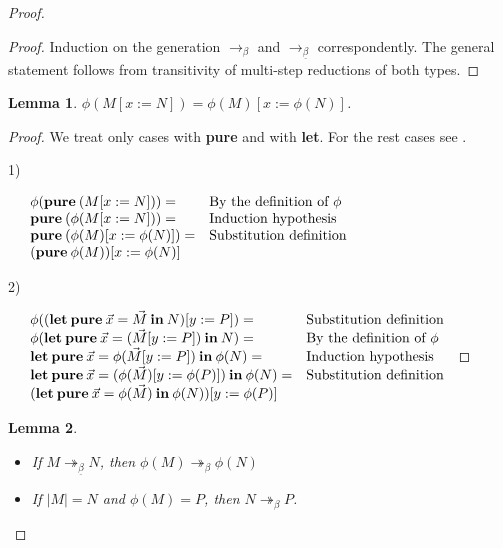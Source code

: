 \documentclass[a4paper]{article}
\newtheorem{lemma}{Lemma}
\begin{document}
\begin{proof}
\begin{proof}

  Induction on the generation $\rightarrow_{\beta}$ and $\rightarrow_{\underline{\beta}}$ correspondently. The general statement follows from transitivity
  of multi-step reductions of both types.
\end{proof}

\begin{lemma}
  $\phi(M [x := N]) = \phi(M) [x := \phi(N)]$.
\end{lemma}

\begin{proof}
  We treat only cases with {\bf pure} and with {\bf let}. For the rest cases see \cite{Baren}.

  1)
  $ $

  $\begin{array}{lll}
  & \phi({\bf pure \:} (M [x := N])) = & \text{By the definition of $\phi$}\\
  & {\bf pure \:} (\phi(M [x := N])) = & \text{Induction hypothesis} \\
  & {\bf pure \:} (\phi(M) [x := \phi(N)]) = & \text{Substitution definition}\\
  & ({\bf pure \:} \phi (M)) [x := \phi(N)]&
  \end{array}$

  2)
  $ $

  $\begin{array}{lll}
  &\phi(({\bf let \: pure \:} \vec{x} = \vec{M} {\: \bf in \:} N) [y := P]) = & \text{Substitution definition}\\
  &\phi({\bf let \: pure \:} \vec{x} = (\vec{M}[y := P]) {\: \bf in \:} N) = & \text{By the definition of $\phi$}\\
  &{\bf let \: pure \:} \vec{x} = \phi(\vec{M}[y := P]) {\: \bf in \:} \phi(N) = & \text{Induction hypothesis} \\
  &{\bf let \: pure \:} \vec{x} = (\phi(\vec{M}) [y := \phi(P)]) {\: \bf in \:} \phi(N) =& \text{Substitution definition} \\
  &({\bf let \: pure \:} \vec{x} = \phi(\vec{M}) {\: \bf in \:} \phi(N))[y := \phi(P)]
  \end{array}$

\end{proof}

\begin{lemma}
  $ $

  \begin{itemize}
  \item If $M \twoheadrightarrow_{\underline{\beta}} N$, then $\phi(M) \twoheadrightarrow_{\beta} \phi(N)$
  \item If $|M| = N$ and $\phi(M) = P$, then $N \twoheadrightarrow_{\beta} P$.
  \end{itemize}
\end{lemma}


\end{proof}
\end{document}
